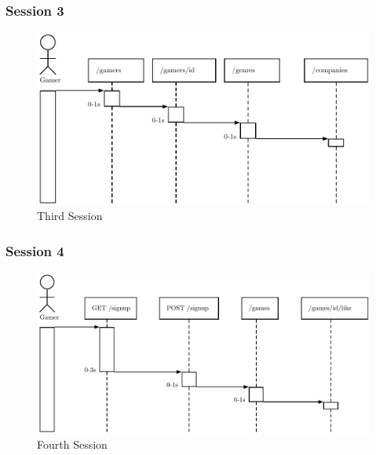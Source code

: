 \begin{frame}
\frametitle{Session 3}
\begin{figure}[h]
	\centering
	\includegraphics[width=1\textwidth, height=0.5\textheight]{images/generic-3.pdf}
	\caption{Third Session}\label{fig:sqlopt}
\end{figure}
\end{frame}

\begin{frame}
\frametitle{Session 4}
\begin{figure}[h]
	\centering
	\includegraphics[width=1\textwidth, height=0.5\textheight]{images/generic-4.pdf}
	\caption{Fourth Session}\label{fig:sqlopt}
\end{figure}
\end{frame}
